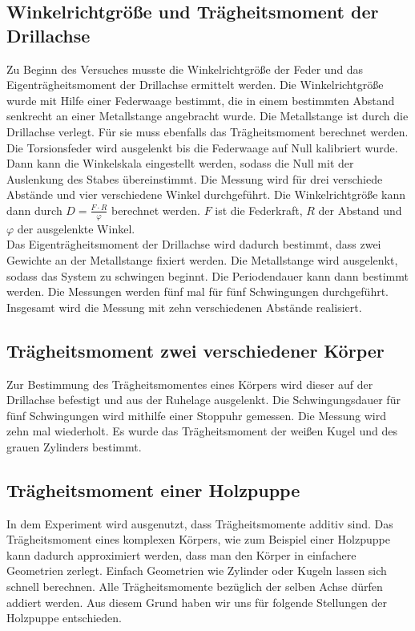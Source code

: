 \subsection{Winkelrichtgröße und Trägheitsmoment der Drillachse}
Zu Beginn des Versuches musste die Winkelrichtgröße der Feder und das Eigenträgheitsmoment der Drillachse ermittelt werden. Die Winkelrichtgröße wurde mit Hilfe einer Federwaage bestimmt,
die in einem bestimmten Abstand senkrecht an einer Metallstange angebracht wurde. Die Metallstange ist durch die Drillachse verlegt. Für sie muss ebenfalls das Trägheitsmoment berechnet werden.
Die Torsionsfeder
wird ausgelenkt bis die Federwaage auf Null kalibriert wurde. Dann kann die Winkelskala eingestellt werden, sodass die Null mit der Auslenkung des Stabes übereinstimmt. Die Messung wird für
drei verschiede Abstände und vier verschiedene Winkel durchgeführt. Die Winkelrichtgröße kann dann durch $D = \frac{F\cdot R}{\varphi}$ berechnet werden. $F$ ist die Federkraft, $R$ der
Abstand und $\varphi$ der ausgelenkte Winkel.\\
Das Eigenträgheitsmoment der Drillachse wird dadurch bestimmt, dass zwei Gewichte an der Metallstange fixiert werden. Die Metallstange wird ausgelenkt, sodass das System zu schwingen beginnt.
Die Periodendauer kann dann bestimmt werden. Die Messungen werden fünf mal für fünf Schwingungen durchgeführt. Insgesamt wird die Messung mit zehn verschiedenen Abstände realisiert.
\subsection{Trägheitsmoment zwei verschiedener Körper}
Zur Bestimmung des Trägheitsmomentes eines Körpers wird dieser auf der Drillachse befestigt und aus der Ruhelage ausgelenkt. Die Schwingungsdauer für fünf Schwingungen wird mithilfe einer
Stoppuhr gemessen. Die Messung wird zehn mal wiederholt.
Es wurde das Trägheitsmoment der weißen Kugel und des grauen Zylinders bestimmt.
\subsection{Trägheitsmoment einer Holzpuppe}
In dem Experiment wird ausgenutzt, dass Trägheitsmomente additiv sind. Das Trägheitsmoment eines komplexen Körpers, wie zum Beispiel einer Holzpuppe kann dadurch approximiert werden, dass
man den Körper in einfachere Geometrien zerlegt. Einfach Geometrien wie Zylinder oder Kugeln lassen sich schnell berechnen. Alle Trägheitsmomente bezüglich der selben Achse dürfen addiert
werden.
Aus diesem Grund haben wir uns für folgende Stellungen der Holzpuppe entschieden.

